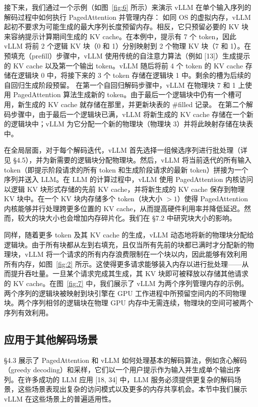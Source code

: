 \documentclass[11pt,UTF8,fontset=fandol]{ctexart}
\begin{document}
接下来，我们通过一个示例（如图~\ref{fig:6} 所示）来演示 vLLM 在单个输入序列的解码过程中如何执行 PagedAttention 并管理内存： 如同 OS 的虚拟内存，vLLM 起初不要求为可能生成的最大序列长度预留内存。相反，它只预留必要的 KV 块来容纳提示计算期间生成的 KV cache。在本例中，提示有 7 个 token，因此 vLLM 将前 2 个逻辑 KV 块（0 和 1）分别映射到 2 个物理 KV 块（7 和 1）。在预填充（prefill）步骤中，vLLM 使用传统的自注意力算法（例如 [13]）生成提示的 KV cache 以及第一个输出 token。vLLM 随后将前 4 个 token 的 KV cache 存储在逻辑块 0 中，将接下来的 3 个 token 存储在逻辑块 1 中。剩余的槽为后续的自回归生成阶段预留。 在第一个自回归解码步骤中，vLLM 在物理块 7 和 1 上使用 PagedAttention 算法生成新的 token。由于最后一个逻辑块中仍有一个槽可用，新生成的 KV cache 就存储在那里，并更新块表的 \#filled 记录。 在第二个解码步骤中，由于最后一个逻辑块已满，vLLM 将新生成的 KV cache 存储在一个新的逻辑块中；vLLM 为它分配一个新的物理块（物理块 3）并将此映射存储在块表中。

在全局层面，对于每个解码迭代，vLLM 首先选择一组候选序列进行批处理（详见 \S4.5），并为新需要的逻辑块分配物理块。然后，vLLM 将当前迭代的所有输入 token（即提示阶段请求的所有 token 和生成阶段请求的最新 token）拼接为一个序列并送入 LLM。在 LLM 的计算过程中，vLLM 使用 PagedAttention 内核访问以逻辑 KV 块形式存储的先前 KV cache，并将新生成的 KV cache 保存到物理 KV 块中。在一个 KV 块内存储多个 token（块大小 $> 1$）使得 PagedAttention 内核能够并行处理跨更多位置的 KV cache，从而提高硬件利用率并降低延迟。然而，较大的块大小也会增加内存碎片化。我们在 \S7.2 中研究块大小的影响。

同样，随着更多 token 及其 KV cache 的生成，vLLM 动态地将新的物理块分配给逻辑块。由于所有块都从左到右填充，且仅当所有先前的块都已满时才分配新的物理块，vLLM 将一个请求的所有内存浪费限制在一个块以内，因此能够有效利用所有内存，如图~\ref{fig:2} 所示。这使得更多请求能够装入内存以进行批处理——从而提升吞吐量。一旦某个请求完成其生成，其 KV 块即可被释放以存储其他请求的 KV cache。在图~\ref{fig:7} 中，我们展示了 vLLM 为两个序列管理内存的示例。两个序列的逻辑块被映射到块引擎在 GPU 工作进程中所预留空间内的不同物理块。两个序列相邻的逻辑块在物理 GPU 内存中无需连续，物理块的空间可被两个序列有效利用。

\subsection{应用于其他解码场景}

\S4.3 展示了 PagedAttention 和 vLLM 如何处理基本的解码算法，例如贪心解码（greedy decoding）和采样，它们以一个用户提示作为输入并生成单个输出序列。在许多成功的 LLM 应用 [18, 34] 中，LLM 服务必须提供更复杂的解码场景，这些场景表现出复杂的访问模式以及更多的内存共享机会。本节中我们展示 vLLM 在这些场景上的普遍适用性。
\end{document}
